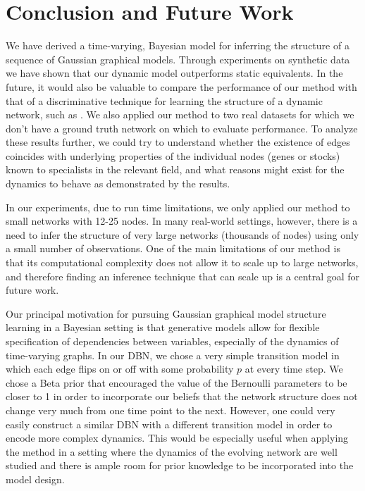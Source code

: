 \documentclass{article}
\begin{document}


\section{Conclusion and Future Work}
\label{sec:concl_future_work}

We have derived a time-varying, Bayesian model for inferring the structure of a sequence of Gaussian graphical models. Through experiments on synthetic data we have shown that our dynamic model outperforms static equivalents. In the future, it would also be valuable to compare the performance of our method with that of a discriminative technique for learning the structure of a dynamic network, such as \cite{song2009keller}. We also applied our method to two real datasets for which we don't have a ground truth network on which to evaluate performance. To analyze these results further, we could try to understand whether the existence of edges coincides with underlying properties of the individual nodes (genes or stocks) known to specialists in the relevant field, and what reasons might exist for the dynamics to behave as demonstrated by the results. 

In our experiments, due to run time limitations, we only applied our method to small networks with 12-25 nodes. In many real-world settings, however, there is a need to infer the structure of very large networks (thousands of nodes) using only a small number of observations. One of the main limitations of our method is that its computational complexity does not allow it to scale up to large networks, and therefore finding an inference technique that can scale up is a central goal for future work.

Our principal motivation for pursuing Gaussian graphical model structure learning in a Bayesian setting is that generative models allow for flexible specification of dependencies between variables, especially of the dynamics of time-varying graphs. In our DBN, we chose a very simple transition model in which each edge flips on or off with some probability $p$ at every time step. We chose a Beta prior that encouraged the value of the Bernoulli parameters to be closer to 1 in order to incorporate our beliefs that the network structure does not change very much from one time point to the next. However, one could very easily construct a similar DBN with a different transition model in order to encode more complex dynamics. This would be especially useful when applying the method in a setting where the dynamics of the evolving network are well studied and there is ample room for prior knowledge to be incorporated into the model design.


\begin{small}

 

\end{small}
\end{document}
